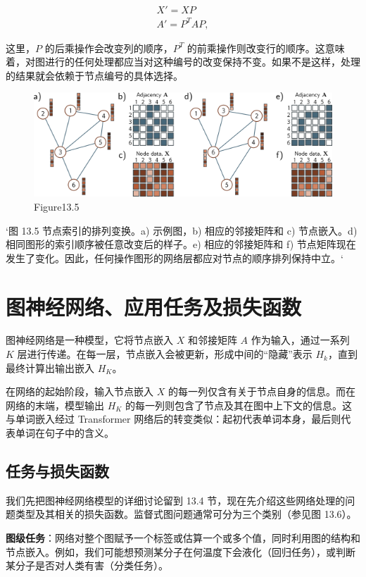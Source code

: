 \begin{align}
X' = XP \\
A' = P^TAP, \tag{13.1}
\end{align} 


这里，\(P\) 的后乘操作会改变列的顺序，\(P^T\) 的前乘操作则改变行的顺序。这意味着，对图进行的任何处理都应当对这种编号的改变保持不变。如果不是这样，处理的结果就会依赖于节点编号的具体选择。

\begin{figure}[ht!]
\centering
\includegraphics[width=0.7\linewidth]{png/chapter13/GraphNodeEquiv.png}
\caption{Figure13.5}
\end{figure}

`图 13.5 节点索引的排列变换。a) 示例图，b) 相应的邻接矩阵和 c) 节点嵌入。d) 相同图形的索引顺序被任意改变后的样子。e) 相应的邻接矩阵和 f) 节点矩阵现在发生了变化。因此，任何操作图形的网络层都应对节点的顺序排列保持中立。`

\section{图神经网络、应用任务及损失函数}
图神经网络是一种模型，它将节点嵌入 \(X\) 和邻接矩阵 \(A\) 作为输入，通过一系列 \(K\) 层进行传递。在每一层，节点嵌入会被更新，形成中间的“隐藏”表示 \(H_k\)，直到最终计算出输出嵌入 \(H_K\)。

在网络的起始阶段，输入节点嵌入 \(X\) 的每一列仅含有关于节点自身的信息。而在网络的末端，模型输出 \(H_K\) 的每一列则包含了节点及其在图中上下文的信息。这与单词嵌入经过 Transformer 网络后的转变类似：起初代表单词本身，最后则代表单词在句子中的含义。

\subsection{任务与损失函数}
我们先把图神经网络模型的详细讨论留到 13.4 节，现在先介绍这些网络处理的问题类型及其相关的损失函数。监督式图问题通常可分为三个类别（参见图 13.6）。

\textbf{图级任务}：网络对整个图赋予一个标签或估算一个或多个值，同时利用图的结构和节点嵌入。例如，我们可能想预测某分子在何温度下会液化（回归任务），或判断某分子是否对人类有害（分类任务）。

